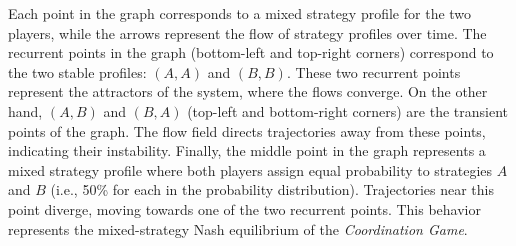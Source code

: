         \noindent
        Each point in the graph corresponds to a mixed strategy profile for the two players, while the arrows represent the flow of strategy profiles over time. The recurrent points in the graph (bottom-left and top-right corners) correspond to the two stable profiles: $(A,A)$ and $(B,B)$. These two recurrent points represent the attractors of the system, where the flows converge. On the other hand, $(A,B)$ and $(B,A)$ (top-left and bottom-right corners) are the transient points of the graph. The flow field directs trajectories away from these points, indicating their instability. Finally, the middle point in the graph represents a mixed strategy profile where both players assign equal probability to strategies $A$ and $B$ (i.e., 50\% for each in the probability distribution). Trajectories near this point diverge, moving towards one of the two recurrent points. This behavior represents the mixed-strategy Nash equilibrium of the \emph{Coordination Game}.
